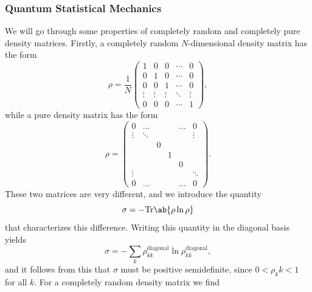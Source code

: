 \subsubsection{Quantum Statistical Mechanics}
We will go through some properties of completely random and completely pure density matrices. Firstly, a completely random $N$-dimensional density matrix has the form
\begin{equation}
    \rho = \frac{1}{N}
        \begin{pmatrix}
            1       & 0         & 0         & \cdots    & 0\\
            0       & 1         & 0         & \cdots    & 0\\
            0       & 0         & 1         & \cdots    & 0\\
            \vdots  & \vdots    & \vdots    & \ddots    & \vdots\\
            0       & 0         & 0         & \cdots    & 1
        \end{pmatrix},
\end{equation}
while a pure density matrix has the form
\begin{equation}
    \rho = 
        \begin{pmatrix}
            0      & \dots  &        &        & \dots  & 0      \\
            \vdots & \ddots &        &        &        & \vdots \\
                   &        & 0      &        &        &        \\
                   &        &        & 1      &        &        \\
                   &        &        &        & 0      &        \\
            \vdots &        &        &        &        & \ddots \\
            0      & \dots  &        &        & \dots  & 0
    \end{pmatrix}.
\end{equation}
These two matrices are very different, and we introduce the quantity
\begin{equation}
    \sigma = -\trace{\rho\ln\rho}
\end{equation}
that characterizes this difference. Writing this quantity in the diagonal basis yields
\begin{equation}
    \sigma = - \sum_k \rho_{kk}^\text{diagonal} \ln\rho_{kk}^\text{diagonal},
\end{equation}
and it follows from this that $\sigma$ must be positive semidefinite, since $0<\rho_kk<1$ for all $k$. For a completely random density matrix we find
